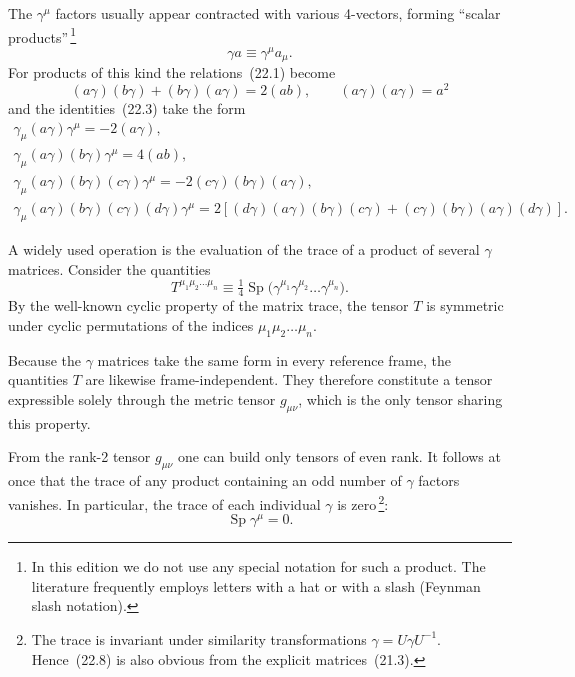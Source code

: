 The $\gamma^\mu$ factors usually appear contracted with various 4-vectors, forming ``scalar products''\,\footnote{In this edition we do not use any special notation for such a product. The literature frequently employs letters with a hat or with a slash (Feynman slash notation).}
\begin{equation}
\gamma a \equiv \gamma^\mu a_\mu.
\tag{22.4}
\end{equation}
For products of this kind the relations~(22.1) become
\begin{equation}
(a\gamma)(b\gamma) + (b\gamma)(a\gamma) = 2(ab),\qquad (a\gamma)(a\gamma) = a^2
\tag{22.5}
\end{equation}
and the identities~(22.3) take the form
\begin{equation}
\begin{gathered}
\gamma_\mu(a\gamma)\gamma^\mu = -2(a\gamma),\\
\gamma_\mu(a\gamma)(b\gamma)\gamma^\mu = 4(ab),\\
\gamma_\mu(a\gamma)(b\gamma)(c\gamma)\gamma^\mu = -2(c\gamma)(b\gamma)(a\gamma),\\
\gamma_\mu(a\gamma)(b\gamma)(c\gamma)(d\gamma)\gamma^\mu = 2[(d\gamma)(a\gamma)(b\gamma)(c\gamma) + (c\gamma)(b\gamma)(a\gamma)(d\gamma)].
\end{gathered}
\tag{22.6}
\end{equation}

A widely used operation is the evaluation of the trace of a product of several $\gamma$ matrices. Consider the quantities
\begin{equation}
T^{\mu_1\mu_2\ldots\mu_n} \equiv \tfrac{1}{4}\operatorname{Sp}\bigl(\gamma^{\mu_1}\gamma^{\mu_2}\ldots\gamma^{\mu_n}\bigr).
\tag{22.7}
\end{equation}
By the well-known cyclic property of the matrix trace, the tensor $T$ is symmetric under cyclic permutations of the indices $\mu_1\mu_2\ldots\mu_n$.

Because the $\gamma$ matrices take the same form in every reference frame, the quantities $T$ are likewise frame-independent. They therefore constitute a tensor expressible solely through the metric tensor $g_{\mu\nu}$, which is the only tensor sharing this property.

From the rank-2 tensor $g_{\mu\nu}$ one can build only tensors of even rank. It follows at once that the trace of any product containing an odd number of $\gamma$ factors vanishes. In particular, the trace of each individual $\gamma$ is zero\,\footnote{The trace is invariant under similarity transformations $\gamma = U\gamma U^{-1}$. Hence~(22.8) is also obvious from the explicit matrices~(21.3).}:
\begin{equation}
\operatorname{Sp}\gamma^\mu = 0.
\tag{22.8}
\end{equation}

